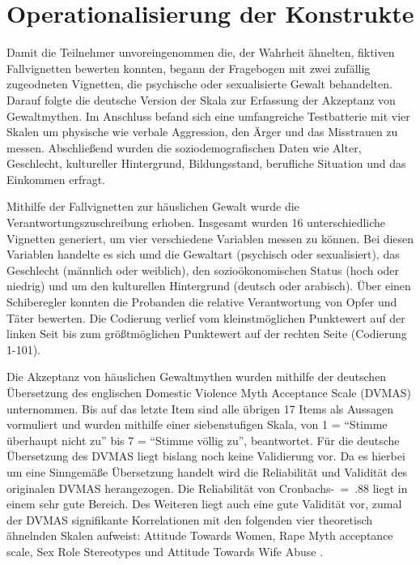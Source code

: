 \section{Operationalisierung der Konstrukte}    \label{sec_3.3}
Damit die Teilnehmer unvoreingenommen die, der Wahrheit ähnelten, fiktiven Fallvignetten bewerten konnten, begann der Fragebogen mit zwei zufällig zugeodneten Vignetten, die psychische oder sexualisierte Gewalt behandelten. Darauf folgte die deutsche Version der Skala zur Erfassung der Akzeptanz von Gewaltmythen. Im Anschluss befand sich eine umfangreiche Testbatterie mit vier Skalen um physische wie verbale Aggression, den Ärger und das Misstrauen zu messen. Abschließend wurden die soziodemografischen Daten wie Alter, Geschlecht, kultureller Hintergrund, Bildungsstand, berufliche Situation und das Einkommen erfragt.

Mithilfe der Fallvignetten zur häuslichen Gewalt wurde die Verantwortungszuschreibung erhoben. Insgesamt wurden 16 unterschiedliche Vignetten generiert, um vier verschiedene Variablen messen zu können. Bei diesen Variablen handelte es sich umd die Gewaltart (psychisch oder sexualisiert), das Geschlecht (männlich oder weiblich), den sozioökonomischen Status (hoch oder niedrig) und um den kulturellen Hintergrund (deutsch oder arabisch). Über einen Schiberegler konnten die Probanden die relative Verantwortung von Opfer und Täter bewerten. Die Codierung verlief vom kleinstmöglichen Punktewert auf der linken Seit bis zum größtmöglichen Punktewert auf der rechten Seite (Codierung 1-101). 

Die Akzeptanz von häuslichen Gewaltmythen wurden mithilfe der deutschen Übersetzung des englischen Domestic Violence Myth Acceptance Scale (DVMAS) \parencite{Peters2003} unternommen. Bis auf das letzte Item sind alle übrigen 17 Items als Aussagen vormuliert und wurden mithilfe einer siebenstufigen Skala, von 1 = \enquote{Stimme überhaupt nicht zu} bis 7 = \enquote{Stimme völlig zu}, beantwortet. Für die deutsche Übersetzung des DVMAS liegt bislang noch keine Validierung vor. Da es hierbei um eine Sinngemäße Übersetzung handelt wird die Reliabilität und Validität des originalen DVMAS herangezogen. Die Reliabilität von Cronbachs-\textalpha~=~.88 liegt in einem sehr gute Bereich. Des Weiteren liegt auch eine gute Validität vor, zumal der DVMAS signifikante Korrelationen mit den folgenden vier theoretisch ähnelnden Skalen aufweist: Attitude Towards Women, Rape Myth acceptance scale, Sex Role Stereotypes und Attitude Towards Wife Abuse \parencite{DVMAS_Peters}.

